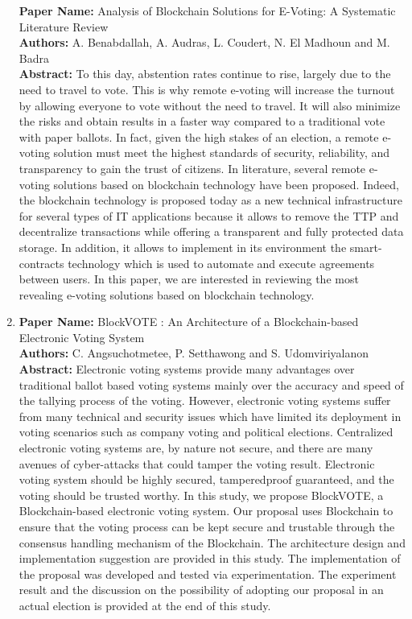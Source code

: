 \documentclass[a4paper, oneside, 12pt]{book}
\begin{document}
\begin{enumerate}
					\textbf{Paper Name:} Analysis of Blockchain Solutions for E-Voting: A Systematic Literature Review\\
					\textbf{Authors:} A. Benabdallah, A. Audras, L. Coudert, N. El Madhoun and M. Badra\\
					\textbf{Abstract:} To this day, abstention rates continue to rise, largely due to the need to travel to vote. This is why remote e-voting will increase the turnout by allowing everyone to vote without the need to travel. It will also minimize the risks and obtain results in a faster way compared to a traditional vote with paper ballots. In fact, given the high stakes of an election, a remote e-voting solution must meet the highest standards of security, reliability, and transparency to gain the trust of citizens. In literature, several remote e-voting solutions based on blockchain technology have been proposed. Indeed, the blockchain technology is proposed today as a new technical infrastructure for several types of IT applications because it allows to remove the TTP and decentralize transactions while offering a transparent and fully protected data storage. In addition, it allows to implement in its environment the smart-contracts technology which is used to automate and execute agreements between users. In this paper, we are interested in reviewing the most revealing e-voting solutions based on blockchain technology.
				\item
					\textbf{Paper Name:} BlockVOTE : An Architecture of a Blockchain-based Electronic Voting System\\
					\textbf{Authors:} C. Angsuchotmetee, P. Setthawong and S. Udomviriyalanon\\
					\textbf{Abstract:} Electronic voting systems provide many advantages over traditional ballot based voting systems mainly over the accuracy and speed of the tallying process of the voting. However, electronic voting systems suffer from many technical and security issues which have limited its deployment in voting scenarios such as company voting and political elections. Centralized electronic voting systems are, by nature not secure, and there are many avenues of cyber-attacks that could tamper the voting result. Electronic voting system should be highly secured, tamperedproof guaranteed, and the voting should be trusted worthy. In this study, we propose BlockVOTE, a Blockchain-based electronic voting system. Our proposal uses Blockchain to ensure that the voting process can be kept secure and trustable through the consensus handling mechanism of the Blockchain. The architecture design and implementation suggestion are provided in this study. The implementation of the proposal was developed and tested via experimentation. The experiment result and the discussion on the possibility of adopting our proposal in an actual election is provided at the end of this study.
			\end{enumerate}
	\newpage
\end{document}
